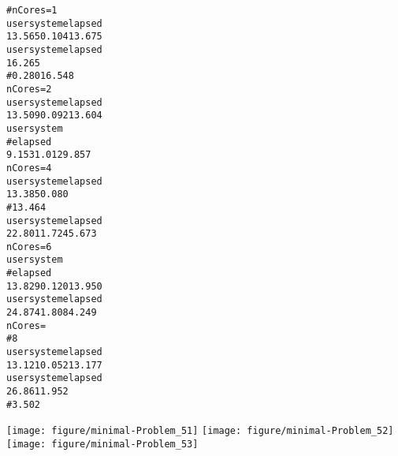 \documentclass{article}\usepackage[]{graphicx}\usepackage[]{color}
\makeatletter
\def\maxwidth{ %
  \ifdim\Gin@nat@width>\linewidth
    \linewidth
  \else
    \Gin@nat@width
  \fi
}
\newenvironment{kframe}{%
 \def\at@end@of@kframe{}%
 \ifinner\ifhmode%
  \def\at@end@of@kframe{\end{minipage}}%
  \begin{minipage}{\columnwidth}%
 \fi\fi%
 \def\FrameCommand##1{\hskip\@totalleftmargin \hskip-\fboxsep
 \colorbox{shadecolor}{##1}\hskip-\fboxsep
     \hskip-\linewidth \hskip-\@totalleftmargin \hskip\columnwidth}%
 \MakeFramed {\advance\hsize-\width
   \@totalleftmargin\z@ \linewidth\hsize
   \@setminipage}}%
 {\par\unskip\endMakeFramed%
 \at@end@of@kframe}
\newenvironment{knitrout}{}{} %
\makeatother
\begin{document}
\begin{knitrout}
\begin{kframe}
\begin{alltt}
# nCores = 1\\ user system elapsed\\ 13.565 0.104 13.675\\ user system elapsed\\ 16.265
# 0.280 16.548\\ nCores = 2\\ user system elapsed\\ 13.509 0.092 13.604\\ user system
# elapsed\\ 9.153 1.012 9.857\\ nCores = 4\\ user system elapsed\\ 13.385 0.080
# 13.464\\ user system elapsed\\ 22.801 1.724 5.673\\ nCores = 6\\ user system
# elapsed\\ 13.829 0.120 13.950\\ user system elapsed\\ 24.874 1.808 4.249\\ nCores =
# 8\\ user system elapsed\\ 13.121 0.052 13.177\\ user system elapsed\\ 26.861 1.952
# 3.502\\
\end{alltt}
\end{kframe}

{\centering \texttt{[image: figure/minimal-Problem\_51]} 
\texttt{[image: figure/minimal-Problem\_52]} 
\texttt{[image: figure/minimal-Problem\_53]} 

}



\end{knitrout}
\end{document}
